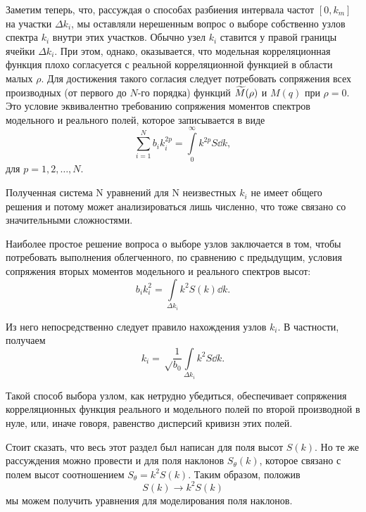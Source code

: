 Заметим теперь, что, рассуждая о способах разбиения интервала частот $[0, k_m]$ на участки $\Delta k_i$, мы оставляли нерешенным вопрос о выборе собственно узлов спектра $k_i$ внутри этих участков. Обычно узел $k_i$ ставится у правой границы ячейки $\Delta k_i$. При этом, однако, оказывается, что модельная корреляционная функция плохо согласуется с реальной корреляционной функцией в области малых $\rho$. Для достижения такого согласия следует потребовать сопряжения всех производных (от первого до $N$-го порядка) функций $\widetilde{M}(\rho)$ и $M(q)$ при $\rho=0$. Это условие эквивалентно требованию сопряжения моментов спектров модельного и реального полей, которое записывается в виде 
\begin{equation}
	\sum_{i=1}^N b_ik_i^{2p}=\int\limits_{0}^{\infty} k^{2p}S\dd{k},
\end{equation}
для $p=1,2,\dots,N.$

Полученная система N уравнений для N неизвестных $k_i$ не имеет общего решения и потому может анализироваться лишь численно, что тоже связано со значительными сложностями.



Наиболее простое решение вопроса о выборе узлов заключается в том, чтобы потребовать выполнения облегченного, по сравнению с предыдущим, условия сопряжения вторых моментов модельного и реального спектров высот:
\begin{equation}
	b_i k_i^2=\int\limits_{\Delta k_i} k^2 S(k)  \dd{k}.
\end{equation}

Из него непосредственно следует правило нахождения узлов $k_i$. В частности, получаем
\begin{equation}
	k_i=\sqrt\frac{1}{b_0} \int\limits_{\Delta k_i} k^2 S \dd{k}.
\end{equation}

Такой способ выбора узлом, как нетрудно убедиться, обеспечивает сопряжения корреляционных функция реального и модельного полей по второй производной в нуле, или, иначе говоря, равенство дисперсий кривизн этих полей. 




Стоит сказать, что весь этот раздел был написан для поля высот $S(k)$. Но те же рассуждения можно провести и для поля наклонов $S_{\theta}(k)$, которое связано с полем высот соотношением $S_{\theta}=k^2 S(k)$. Таким образом, положив 
\begin{equation}
	S(k)\longrightarrow k^2 S(k)
\end{equation}
мы можем получить уравнения для моделирования поля наклонов. 

